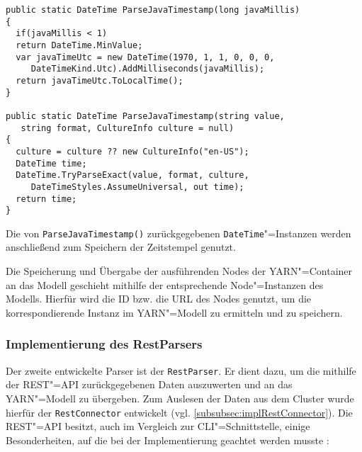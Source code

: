 \begin{lstlisting}[label=lst:parseJavaTimestamp,style=cs,
caption={[Überladungen der Methode ParseJavaTimestamp()]
    Überladungen der Methode \texttt{ParseJavaTimestamp()}.
    Es steht zudem eine weitere Überladung zur Verfügung, um den Java"=Timestamp als \texttt{string} zu übergeben.
    Dabei wird der \texttt{string} in einen \texttt{long} konvertiert und anschließend die erste hier gezeigte Überladung aufgerufen.}]
public static DateTime ParseJavaTimestamp(long javaMillis)
{
  if(javaMillis < 1)
  return DateTime.MinValue;
  var javaTimeUtc = new DateTime(1970, 1, 1, 0, 0, 0,
     DateTimeKind.Utc).AddMilliseconds(javaMillis);
  return javaTimeUtc.ToLocalTime();
}

public static DateTime ParseJavaTimestamp(string value,
   string format, CultureInfo culture = null)
{
  culture = culture ?? new CultureInfo("en-US");
  DateTime time;
  DateTime.TryParseExact(value, format, culture,
     DateTimeStyles.AssumeUniversal, out time);
  return time;
}
\end{lstlisting}

Die von \texttt{ParseJavaTimestamp()} zurückgegebenen \texttt{DateTime}"=Instanzen werden anschließend zum Speichern der Zeitstempel genutzt.

Die Speicherung und Übergabe der ausführenden Nodes der YARN"=Container an das Modell geschieht mithilfe der entsprechende Node"=Instanzen des Modells.
Hierfür wird die ID bzw. die URL des Nodes genutzt, um die korrespondierende Instanz im YARN"=Modell zu ermitteln und zu speichern.

\subsubsection{Implementierung des RestParsers}
\label{subsubsec:implRestParser}

Der zweite entwickelte Parser ist der \texttt{RestParser}.
Er dient dazu, um die mithilfe der REST"=API zurückgegebenen Daten auszuwerten und an das YARN"=Modell zu übergeben.
Zum Auslesen der Daten aus dem Cluster wurde hierfür der \texttt{RestConnector} entwickelt (vgl. \cref{subsubsec:implRestConnector}).
Die REST"=API besitzt, auch im Vergleich zur \gls{CLI}"=Schnittstelle, einige Besonderheiten, auf die bei der Implementierung geachtet werden musste \cite{HadoopYarnCmds271,HadoopRmApi271,HadoopNmApi271,HadoopYarnTlServer271}:

